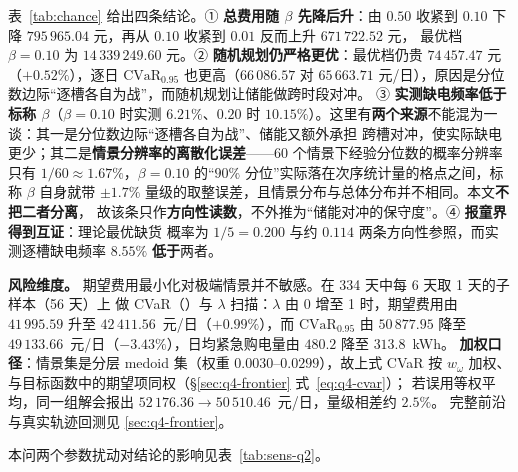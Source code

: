 表~\ref{tab:chance} 给出四条结论。① \textbf{总费用随 \(\beta\) 先降后升}：由 \(0.50\) 收紧到
\(0.10\) 下降 \(795\,965.04\) 元，再从 \(0.10\) 收紧到 \(0.01\) 反而上升 \(671\,722.52\) 元，
最优档 \(\beta=0.10\) 为 \(14\,339\,249.60\) 元。② \textbf{随机规划仍严格更优}：最优档仍贵
\(74\,457.47\) 元（\(+0.52\%\)），逐日 \(\mathrm{CVaR}_{0.95}\) 也更高（\(66\,086.57\) 对
\(65\,663.71\) 元/日），原因是分位数边际“逐槽各自为战”，而随机规划让储能做跨时段对冲。
③ \textbf{实测缺电频率低于标称 \(\beta\)}（\(\beta=0.10\) 时实测 \(6.21\%\)、\(0.20\) 时
\(10.15\%\)）。这里有\textbf{两个来源}不能混为一谈：其一是分位数边际“逐槽各自为战”、储能又额外承担
跨槽对冲，使实际缺电更少；其二是\textbf{情景分辨率的离散化误差}——60 个情景下经验分位数的概率分辨率
只有 \(1/60\approx1.67\%\)，\(\beta=0.10\) 的“\(90\%\) 分位”实际落在次序统计量的格点之间，标称
\(\beta\) 自身就带 \(\pm1.7\%\) 量级的取整误差，且情景分布与总体分布并不相同。本文\textbf{不把二者分离}，
故该条只作\textbf{方向性读数}，不外推为“储能对冲的保守度”。④ \textbf{报童界得到互证}：理论最优缺货
概率为 \(1/5=0.200\) 与约 \(0.114\) 两条方向性参照，而实测逐槽缺电频率 \(8.55\%\) \textbf{低于}两者。

\textbf{风险维度。} 期望费用最小化对极端情景并不敏感。在 334 天中每 6 天取 1 天的子样本（56 天）上
做 CVaR（）与 \(\lambda\) 扫描：\(\lambda\) 由 0 增至 1 时，期望费用由 \(41\,995.59\)
升至 \(42\,411.56\)~元/日（\(+0.99\%\)），而 \(\mathrm{CVaR}_{0.95}\) 由 \(50\,877.95\) 降至
\(49\,133.66\)~元/日（\(-3.43\%\)），日均紧急购电量由 \(480.2\) 降至 \(313.8\)~kWh。
\textbf{加权口径}：情景集是分层 medoid 集（权重 \(0.0030\)--\(0.0299\)），故上式 CVaR 按
\(w_\omega\) 加权、与目标函数中的期望项同权（\S\ref{sec:q4-frontier} 式~\eqref{eq:q4-cvar}）；
若误用等权平均，同一组解会报出 \(52\,176.36\to50\,510.46\)~元/日，量级相差约 \(2.5\%\)。
完整前沿与真实轨迹回测见 \ref{sec:q4-frontier}。

本问两个参数扰动对结论的影响见表~\ref{tab:sens-q2}。

